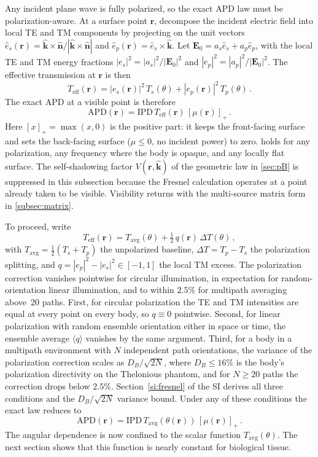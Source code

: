 \documentclass[journal,twocolumn,10pt]{IEEEtran}
\theoremstyle{plain}
\newcommand{\khat}{\hat{\bm{k}}}
\newcommand{\nhat}{\hat{\bm{n}}}
\newcommand{\rr}{\mathbf{r}}
\newcommand{\EE}{\mathbf{E}}
\newcommand{\IPD}{\mathrm{IPD}}
\newcommand{\APD}{\mathrm{APD}}
\newcommand{\Teff}{T_{\mathrm{eff}}}
\newcommand{\Tavg}{T_{\mathrm{avg}}}
\newcommand{\pospart}[1]{\left[#1\right]_{+}}
\newcommand{\Vis}{V}
\begin{document}
Any incident plane wave is fully polarized, so the exact \gls{APD}
law must be polarization-aware. At a surface point
$\rr$, decompose the incident electric field into local TE and TM
components by projecting on the unit vectors
$\hat{e}_s(\rr) = \khat \times \nhat / |\khat \times \nhat|$ and
$\hat{e}_p(\rr) = \hat{e}_s \times \khat$. Let $\EE_0 = a_s \hat{e}_s + a_p \hat{e}_p$, with the local TE and TM
energy fractions $|e_s|^2 = |a_s|^2 / |\EE_0|^2$ and
$|e_p|^2 = |a_p|^2 / |\EE_0|^2$. The effective transmission at $\rr$
is then
\begin{equation}\label{eq:Teff}
  \Teff(\rr) = |e_s(\rr)|^2 \, T_s(\theta) + |e_p(\rr)|^2 \,
  T_p(\theta)\, .
\end{equation}
The exact \gls{APD} at a visible point is therefore
\begin{equation}\label{eq:Sab-exact}
  \APD(\rr) = \IPD \, \Teff(\rr) \, \pospart{\mu(\rr)} \,.
\end{equation}
Here $\pospart{x} = \max(x, 0)$ is the positive part: it keeps the
front-facing surface and sets the back-facing surface ($\mu \le 0$, no
incident power) to zero.
 holds for any polarization, any frequency where
the body is opaque, and any locally flat surface. The self-shadowing
factor $\Vis(\rr,\khat)$ of the geometric law in \cref{sec:pB} is
suppressed in this subsection because the Fresnel calculation
operates at a point already taken to be visible. Visibility returns
with the multi-source matrix form in \cref{subsec:matrix}.

To proceed, write
\begin{equation}\label{eq:Teff-decomp}
  \Teff(\rr) = \Tavg(\theta) + \tfrac{1}{2}\,q(\rr)\,\Delta T(\theta)\, ,
\end{equation}
with $\Tavg = \tfrac{1}{2}(T_s + T_p)$ the unpolarized baseline,
$\Delta T = T_p - T_s$ the polarization splitting, and $q = |e_p|^2 -
|e_s|^2 \in [-1, 1]$ the local TM excess. The polarization correction
vanishes pointwise for circular illumination, in expectation for
random-orientation linear illumination, and to within $2.5\%$ for
multipath averaging above~20 paths. First, for circular polarization
the TE and TM intensities are equal at every point on every body, so
$q \equiv 0$ pointwise. Second, for linear polarization with random
ensemble orientation either in space or time, the ensemble average
$\langle q\rangle$ vanishes by the same argument. Third, for a body
in a multipath environment with $N$ independent path orientations,
the variance of the polarization correction scales as $D_B/\sqrt{2N}$,
where $D_B \le 16\%$ is the body's polarization directivity on the
Thelonious phantom, and for $N \ge 20$ paths the correction drops
below $2.5\%$. Section~\ref{si:fresnel} of the SI derives all three
conditions and the $D_B/\sqrt{2N}$ variance bound. Under any of these conditions the exact law reduces to
\begin{equation}\label{eq:Sab-Tavg}
  \APD(\rr) = \IPD \, \Tavg(\theta(\rr)) \, \pospart{\mu(\rr)}\, .
\end{equation}
The angular dependence is now confined to the scalar function
$\Tavg(\theta)$. The next section shows that this function is nearly
constant for biological tissue.
\end{document}
